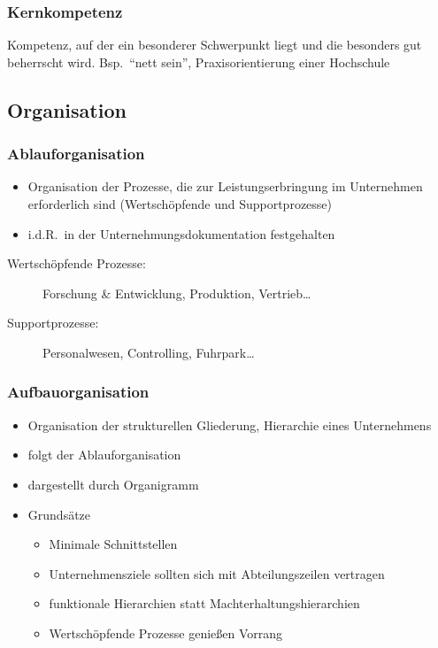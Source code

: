 \documentclass[a4paper, 12pt]{article}
\begin{document}
\subsubsection*{Kernkompetenz}
Kompetenz, auf der ein besonderer Schwerpunkt liegt und die besonders gut beherrscht wird. Bsp.\ ``nett sein'', Praxisorientierung einer Hochschule


\subsection{Organisation}

\subsubsection*{Ablauforganisation}
\begin{itemize}
  \item Organisation der Prozesse, die zur Leistungserbringung im Unternehmen erforderlich sind (Wertschöpfende und Supportprozesse)
  \item i.d.R.\ in der Unternehmungsdokumentation festgehalten
\end{itemize}
\begin{description}
  \item[Wertschöpfende Prozesse:] Forschung \& Entwicklung, Produktion, Vertrieb\ldots
  \item[Supportprozesse:] Personalwesen, Controlling, Fuhrpark\ldots
\end{description}

\subsubsection*{Aufbauorganisation}
\begin{itemize}
  \item Organisation der strukturellen Gliederung, Hierarchie eines Unternehmens
  \item folgt der Ablauforganisation
  \item dargestellt durch Organigramm
  \item Grundsätze
    \begin{itemize}
      \item Minimale Schnittstellen
      \item Unternehmensziele sollten sich mit Abteilungszeilen vertragen
      \item funktionale Hierarchien statt Machterhaltungshierarchien
      \item Wertschöpfende Prozesse genießen Vorrang
    \end{itemize}
\end{itemize}
\end{document}
